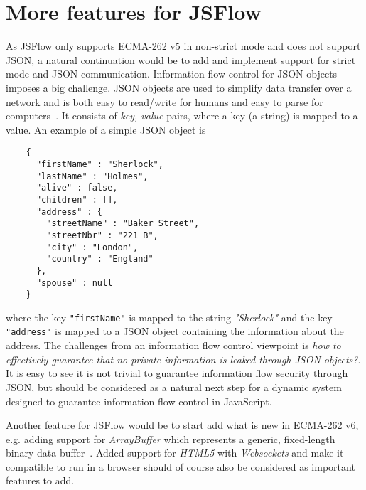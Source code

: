 \section{More features for JSFlow}
As JSFlow only supports ECMA-262 v5 in non-strict mode and does not support JSON, a natural continuation would be to add and implement support for strict mode and JSON communication. Information flow control for JSON objects imposes a big challenge. JSON objects are used to simplify data transfer over a network and is both easy to read/write for humans and easy to parse for computers~\cite{json}. It consists of \emph{key, value} pairs, where a key (a string) is mapped to a value. An example of a simple JSON object is
\begin{verbatim}
    {
      "firstName" : "Sherlock",
      "lastName" : "Holmes",
      "alive" : false,
      "children" : [],
      "address" : {
        "streetName" : "Baker Street",
        "streetNbr" : "221 B",
        "city" : "London",
        "country" : "England"
      },
      "spouse" : null
    }
\end{verbatim}
where the key {\tt "firstName"} is mapped to the string \emph{"Sherlock"} and the key {\tt "address"} is mapped to a JSON object containing the information about the address. The challenges from an information flow control viewpoint is \emph{how to effectively guarantee that no private information is leaked through JSON objects?}. It is easy to see it is not trivial to guarantee information flow security through JSON, but should be considered as a natural next step for a dynamic system designed to guarantee information flow control in JavaScript.

Another feature for JSFlow would be to start add what is new in ECMA-262 v6, e.g. adding support for \emph{ArrayBuffer} which represents a generic, fixed-length binary data buffer~\cite{js_arraybuffer}. Added support for \emph{HTML5} with \emph{Websockets} and make it compatible to run in a browser should of course also be considered as important features to add.


